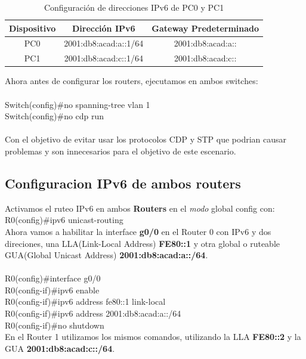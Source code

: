 \documentclass[a4paper,12pt]{article}
\begin{document}
\begin{table}[h]
    \centering
    \begin{tabular}{|c|c|c|}
        \hline
        \textbf{Dispositivo} & \textbf{Dirección IPv6} & \textbf{Gateway Predeterminado} \\
        \hline
        PC0 & 2001:db8:acad:a::1/64 & 2001:db8:acad:a:: \\
        \hline
        PC1 & 2001:db8:acad:c::1/64 & 2001:db8:acad:c:: \\
        \hline
    \end{tabular}
    \caption{Configuración de direcciones IPv6 de PC0 y PC1}
    \label{tab:ipv6_config}
\end{table}

Ahora antes de configurar los routers, ejecutamos en ambos switches:\\
\noindent\\
Switch(config)\#no spanning-tree vlan 1\\
Switch(config)\#no cdp run\\\\
Con el objetivo de evitar usar los protocolos CDP y STP que podrian causar problemas y son innecesarios para el objetivo de este escenario.\\
\subsection{Configuracion IPv6 de ambos routers}
Activamos el ruteo IPv6 en ambos \textbf{Routers} en el \textit{modo} global config con:\\

R0(config)\#ipv6 unicast-routing\\

Ahora vamos a habilitar la interface \textbf{g0/0} en el Router 0 con IPv6 y dos direciones, una LLA(Link-Local Address) \textbf{FE80::1} y otra global o ruteable GUA(Global Unicast Address)\textbf{ 2001:db8:acad:a::/64}.\\
\noindent\\
R0(config)\#interface g0/0\\
R0(config-if)\#ipv6 enable\\
R0(config-if)\#ipv6 address fe80::1 link-local\\
R0(config-if)\#ipv6 address 2001:db8:acad:a::/64\\
R0(config-if)\#no shutdown\\

En el Router 1 utilizamos los mismos comandos, utilizando la LLA \textbf{FE80::2} y la GUA \textbf{2001:db8:acad:c::/64}.\\
\end{document}
